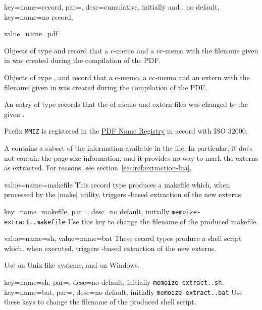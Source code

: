 \documentclass[a4paper,11pt]{article}
\begin{document}
\begin{doc}{
    key={name=record, par=,
      desc={cumulative, initially  and , no default}},
    key={name=no record},
  }
\begin{doc}{value={name=pdf}}
\begin{tcolorbox}[
        title=The structure of \hypercolor{link}{white}\docref{pdfobj:MMIZ_Record},
        sidebyside, lefthand width=13.5em, segmentation engine=empty,
        left=2mm,
      ]
      Objects of type  and  record
      that a c-memo and a cc-memo with the filename given in
       was created during the compilation of the PDF.

      Objects of type ,  and
       record that a c-memo, a cc-memo and an extern
      with the filename given in  was created during the
      compilation of the PDF.

      An entry of type  records that the  of
      memo and extern files was changed to the given .

      Prefix \texttt{MMIZ} is registered in the
      \href{https://github.com/adobe/pdf-names-list}{PDF Name Registry} in accord
      with ISO 32000.
    \end{tcolorbox}
    
    A  contains a subset of the information available in the
    \dmmz file.  In particular, it does not contain the page size information,
    and it provides no way to mark the externs as extracted.  For reasons, see
    section~\ref{sec:ref:extraction-lua}.
  \end{doc}
  \begin{doc}{value={name=makefile}}
    This record type produces a makefile which, when processed by the |make|
    utility, triggers -based extraction of the new externs.
    \begin{doc}{
        key={name=makefile, par=, desc={no default,
            initially \texttt{memoize-extract.\string\jobname.makefile}}}
      }
      Use this key to change the filename of the produced makefile.
    \end{doc}
  \end{doc}
  \begin{doc}{value={name=sh}, value={name=bat}}
    These record types produce a shell script which, when executed, triggers
    -based extraction of the new externs.

    Use  on Unix-like systems, and  on
    Windows.
    
    \begin{doc}{
        key={name=sh, par=, desc={no default,
            initially \texttt{memoize-extract.\string\jobname.sh}}},
        key={name=bat, par=, desc={no default,
            initially \texttt{memoize-extract.\string\jobname.bat}}}
      }
      Use these keys to change the filename of the produced shell script.
    \end{doc}
  \end{doc}
\end{doc}
\end{document}
